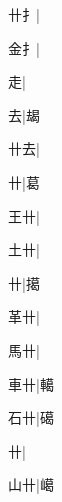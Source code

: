 \begin{multicols}{2}
{{\cjk{}{\cnsym{}　}卄{扌}}|{}\par
{\cjk{}{\cnsym{}　}金{扌}}|{}\par
{\cjk{}{\cnsym{}　}{\cnsym{}　}走}|{}\par
{\cjk{}{\cnsym{}　}{\cnsym{}　}去}|{\cjk{}朅}\par
{\cjk{}{\cnsym{}　}卄去}|{}\par
{\cjk{}{\cnsym{}　}{\cnsym{}　}卄}|{\cjk{}葛}\par
{\cjk{}{\cnsym{}　}王卄}|{}\par
{\cjk{}{\cnsym{}　}土卄}|{}\par
{卄}|{\cjk{}擖}\par
{\cjk{}{\cnsym{}　}革卄}|{}\par
{\cjk{}{\cnsym{}　}馬卄}|{}\par
{\cjk{}{\cnsym{}　}車卄}|{\cjk{}轕}\par
{\cjk{}{\cnsym{}　}石卄}|{\cjk{}礍}\par
{卄}|{}\par
{\cjk{}{\cnsym{}　}山卄}|{\cjk{}嶱}\par
}
\end{multicols}
